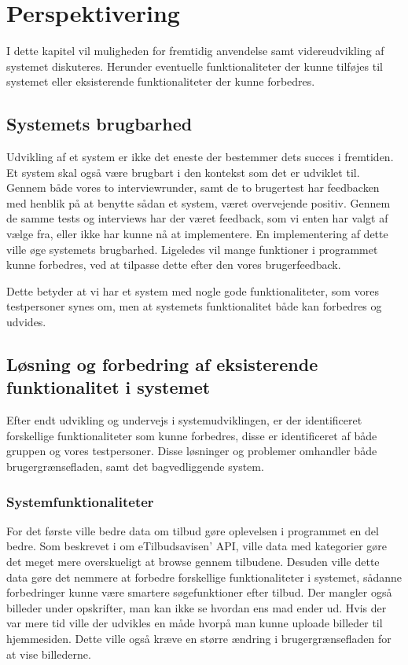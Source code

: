 \chapter{Perspektivering}
I dette kapitel vil muligheden for fremtidig anvendelse samt videreudvikling af systemet diskuteres.
Herunder eventuelle funktionaliteter der kunne tilføjes til systemet eller eksisterende funktionaliteter der kunne forbedres.

\section{Systemets brugbarhed}
Udvikling af et system er ikke det eneste der bestemmer dets succes i fremtiden.
Et system skal også være brugbart i den kontekst som det er udviklet til.
Gennem både vores to interviewrunder, samt de to brugertest har feedbacken med henblik på at benytte sådan et system, været overvejende positiv.
Gennem de samme tests og interviews har der været feedback, som vi enten har valgt af vælge fra, eller ikke har kunne nå at implementere.
En implementering af dette ville øge systemets brugbarhed.
Ligeledes vil mange funktioner i programmet kunne forbedres, ved at tilpasse dette efter den vores brugerfeedback. 

Dette betyder at vi har et system med nogle gode funktionaliteter, som vores testpersoner synes om, men at systemets funktionalitet både kan forbedres og udvides.

\section{Løsning og forbedring af eksisterende funktionalitet i systemet}
Efter endt udvikling og undervejs i systemudviklingen, er der identificeret forskellige funktionaliteter som kunne forbedres, disse er identificeret af både gruppen og vores testpersoner.
Disse løsninger og problemer omhandler både brugergrænsefladen, samt det bagvedliggende system.

\subsection{Systemfunktionaliteter}
For det første ville bedre data om tilbud gøre oplevelsen i programmet en del bedre.
Som beskrevet i  om eTilbudsavisen' API, ville data med kategorier gøre det meget mere overskueligt at browse gennem tilbudene.
Desuden ville dette data gøre det nemmere at forbedre forskellige funktionaliteter i systemet, sådanne forbedringer kunne være smartere søgefunktioner efter tilbud.
Der mangler også billeder under opskrifter, man kan ikke se hvordan ens mad ender ud.
Hvis der var mere tid ville der udvikles en måde hvorpå man kunne uploade billeder til hjemmesiden. 
Dette ville også kræve en større ændring i brugergrænsefladen for at vise billederne.

